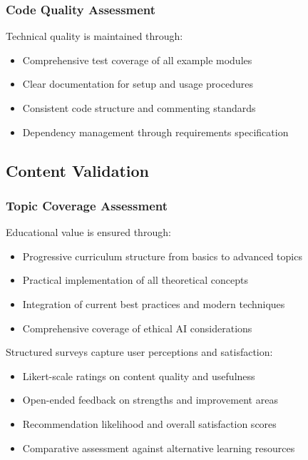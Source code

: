 \subsubsection{Code Quality Assessment}

Technical quality is maintained through:

\begin{itemize}
    \item Comprehensive test coverage of all example modules
    \item Clear documentation for setup and usage procedures
    \item Consistent code structure and commenting standards
    \item Dependency management through requirements specification
\end{itemize}

\subsection{Content Validation}

\subsubsection{Topic Coverage Assessment}

Educational value is ensured through:

\begin{itemize}
    \item Progressive curriculum structure from basics to advanced topics
    \item Practical implementation of all theoretical concepts
    \item Integration of current best practices and modern techniques
    \item Comprehensive coverage of ethical AI considerations
\end{itemize}

Structured surveys capture user perceptions and satisfaction:

\begin{itemize}
    \item Likert-scale ratings on content quality and usefulness
    \item Open-ended feedback on strengths and improvement areas
    \item Recommendation likelihood and overall satisfaction scores
    \item Comparative assessment against alternative learning resources
\end{itemize}

